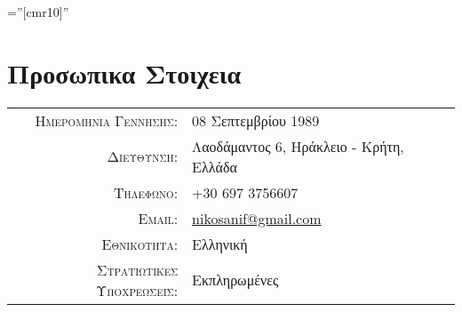 \documentclass[11pt]{article}
\begin{document}

\font\fb=''[cmr10]'' %

\par{\par}
\par{\bigskip\par}
\par{\centering { \textsc{\textcolor{red}{Last Update: December 2020}}}\bigskip\par}

\section{Προσωπικα Στοιχεια}
\begin{tabular}{rl}
    \textsc{Ημερομηνια Γεννησης:} & 08 Σεπτεμβρίου 1989 \\
    \textsc{Διευθυνση:}   & Λαοδάμαντος 6, Ηράκλειο - Κρήτη, Ελλάδα\\
    \textsc{Τηλεφωνο:}     & +30 697 3756607\\
    \textsc{Email:}     & \href{mailto:nikosanif@gmail.com}{nikosanif@gmail.com}\\
    \textsc{Εθνικοτητα:}     & Ελληνική\\
    \textsc{Στρατιωτικες Υποχρεωσεις:}     & Εκπληρωμένες\\
\end{tabular}


\end{document}
